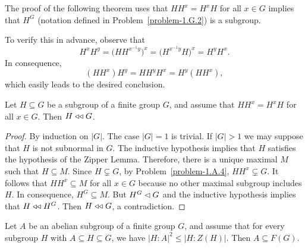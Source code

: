 \begin{rem}
    The proof of the following theorem uses that $HH^x=H^xH$ for all $x\in G$ implies that $H^G$ (notation defined in\/ \textrm{\rm Problem~\ref{problem-1.G.2}}) is a subgroup.
    
    \textrm{\rm To verify this in advance, observe that
    $$
        H^xH^y = \Big(HH^{x^{-1}y}\Big)^x = \Big(H^{x^{-1}y}H\Big)^x = H^yH^x.
    $$
    In consequence,
    $$
        (HH^x)H^y = HH^yH^x = H^y(HH^x),
    $$
    which easily leads to the desired conclusion}.
\end{rem}

\begin{thm}\label{conjugate-commutativity}
   Let\/ $H \subseteq G$ be a subgroup of a finite group\/ $G$, and assume that\/ $HH^x = H^xH$ for all\/ $x \in G$. Then $H \mathrel{\triangleleft\triangleleft} G$.
\end{thm}

\begin{proof} By induction on $|G|$. The case $|G|=1$ is trivial. If $|G|>1$ we may suppose that $H$ is not subnormal in $G$. The inductive hypothesis implies that $H$ satisfies the hypothesis of the Zipper Lemma. Therefore, there is a unique maximal $M$ such that $H\subseteq M$. Since $H\varsubsetneq G$, by Problem~\ref{problem-1.A.4}, $HH^x\varsubsetneq G$. It follows that $HH^x\subseteq M$ for all $x\in G$ because no other maximal subgroup includes $H$. In consequence, $H^G\subseteq M$. But $H^G\lhd G$ and the inductive hypothesis implies that $H\mathrel{\triangleleft\triangleleft} H^G$. Then $H\mathrel{\triangleleft\triangleleft} G$, a contradiction.  \end{proof}

\begin{thm}
    Let\/ $A$ be an abelian subgroup of a finite group\/ $G$, and assume that for every subgroup\/ $H$ with\/ $A \subseteq H \subseteq G$, we have\/ $|H:A|^2 \le |H:Z(H)|$. Then\/ $A \subseteq F(G)$.
\end{thm}

